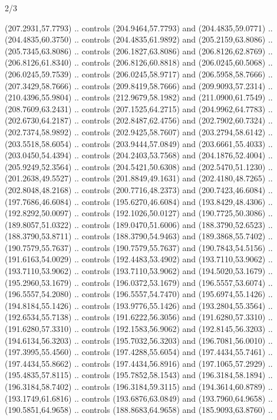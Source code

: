 \begin{flagdescription}{2/3}
\begin{scope}[xshift=0.5\flaglength,yshift=0.5\flagwidth,scale=\flagwidth/180]
\begin{scope}[y=0.8pt, x=0.8pt, yscale=-1,shift={(-168.75,-108.75)}]
  (207.2931,57.7793) .. controls (204.9464,57.7793) and (204.4835,59.0771) ..
  (204.4835,60.3750) .. controls (204.4835,61.9892) and (205.2159,63.8086) ..
  (205.7345,63.8086) .. controls (206.1827,63.8086) and (206.8126,62.8769) ..
  (206.8126,61.8340) .. controls (206.8126,60.8818) and (206.0245,60.5068) ..
  (206.0245,59.7539) .. controls (206.0245,58.9717) and (206.5958,58.7666) ..
  (207.3429,58.7666) .. controls (209.8419,58.7666) and (209.9093,57.2314) ..
  (210.4396,55.9804) .. controls (212.9679,58.1982) and (211.0900,61.7549) ..
  (208.7609,63.2431) .. controls (207.1525,64.2715) and (204.9962,64.7783) ..
  (202.6730,64.2187) .. controls (202.8487,62.4756) and (202.7902,60.7324) ..
  (202.7374,58.9892) .. controls (202.9425,58.7607) and (203.2794,58.6142) ..
  (203.5518,58.6054) .. controls (203.9444,57.0849) and (203.6661,55.4033) ..
  (203.0450,54.4394) .. controls (204.2403,53.7568) and (204.1876,52.4004) ..
  (205.9249,52.3564) .. controls (204.5421,50.6308) and (202.5470,51.1230) ..
  (201.2638,49.5527) .. controls (201.8849,49.1631) and (202.4180,48.7265) ..
  (202.8048,48.2168) .. controls (200.7716,48.2373) and (200.7423,46.6084) ..
  (197.7686,46.6084) .. controls (195.6270,46.6084) and (193.8429,48.4306) ..
  (192.8292,50.0097) .. controls (192.1026,50.0127) and (190.7725,50.3086) ..
  (189.8057,51.0322) .. controls (189.0470,51.6006) and (188.3790,52.6523) ..
  (188.3790,53.8711) .. controls (188.3790,54.9463) and (189.3868,55.7402) ..
  (190.7579,55.7637) .. controls (190.7579,55.7637) and (190.7843,54.5156) ..
  (191.6163,54.0029) .. controls (192.4483,53.4902) and (193.7110,53.9062) ..
  (193.7110,53.9062) .. controls (193.7110,53.9062) and (194.5020,53.1679) ..
  (195.2960,53.1679) .. controls (196.0372,53.1679) and (196.5557,53.6074) ..
  (196.5557,54.2080) .. controls (196.5557,54.7470) and (195.6974,55.1426) ..
  (194.8184,55.1426) .. controls (193.9776,55.1426) and (193.2804,55.3564) ..
  (192.6534,55.7138) .. controls (191.6222,56.3056) and (191.6280,57.3310) ..
  (191.6280,57.3310) .. controls (192.1583,56.9062) and (192.8145,56.3203) ..
  (194.6134,56.3203) .. controls (195.7032,56.3203) and (196.7081,56.0010) ..
  (197.3995,55.4560) .. controls (197.4288,55.6054) and (197.4434,55.7461) ..
  (197.4434,55.8662) .. controls (197.4434,56.8916) and (197.1065,57.2929) ..
  (195.4835,57.8115) .. controls (195.7852,58.1543) and (196.3184,58.1894) ..
  (196.3184,58.7402) .. controls (196.3184,59.3115) and (194.3614,60.8789) ..
  (193.1749,61.6816) .. controls (193.6876,63.0849) and (193.7960,64.9658) ..
  (190.5851,64.9658) .. controls (188.8683,64.9658) and (185.9093,63.8760) ..

\end{scope}
\end{scope}
\end{flagdescription}
